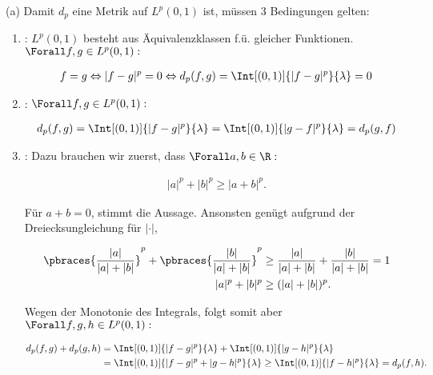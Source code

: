\begin{solution}

(a)
Damit $d_p$ eine Metrik auf $L^p(0, 1)$ ist, müssen 3 Bedingungen gelten:

\begin{enumerate}[label = (\roman*)]

  \item
  :
  $L^p(0, 1)$ besteht aus Äquivalenzklassen f.ü. gleicher Funktionen. $\Forall f, g \in L^p(0, 1):$

  \begin{align*}
    f = g
    \Leftrightarrow
    |f - g|^p = 0
    \Leftrightarrow
    d_p(f, g)
    =
    \Int[(0, 1)]{|f - g|^p}{\lambda} = 0
  \end{align*}

  \item
  :
  $\Forall f, g \in L^p(0, 1):$

  \begin{align*}
    d_p(f, g)
    =
    \Int[(0, 1)]{|f - g|^p}{\lambda}
    =
    \Int[(0, 1)]{|g - f|^p}{\lambda}
    =
    d_p(g, f)
  \end{align*}

  \item
  :
  Dazu brauchen wir zuerst, dass $\Forall a, b \in \R:$

  \begin{align*}
    |a|^p + |b|^p \geq |a + b|^p.
  \end{align*}

  Für $a + b = 0$, stimmt die Aussage.
  Ansonsten genügt aufgrund der Dreiecksungleichung für $|\cdot|$,

  \begin{align*}
    \pbraces{\frac{|a|}{|a| + |b|}}^p +
    \pbraces{\frac{|b|}{|a| + |b|}}^p
    &\geq
    \frac{|a|}{|a| + |b|} +
    \frac{|b|}{|a| + |b|} = 1\\
    |a|^p + |b|^p &\geq (|a| + |b|)^p.
  \end{align*}

  Wegen der Monotonie des Integrals, folgt somit aber $\Forall f, g, h \in L^p(0, 1):$

  \begin{align*}
    d_p(f, g) + d_p(g, h)
    & =
    \Int[(0, 1)]{|f - g|^p}{\lambda} +
    \Int[(0, 1)]{|g - h|^p}{\lambda} \\
    & =
    \Int[(0, 1)]{|f - g|^p + |g - h|^p}{\lambda}
    \geq
    \Int[(0, 1)]{|f - h|^p}{\lambda}
    =
    d_p(f, h).
  \end{align*}


\end{enumerate}
\end{solution}

